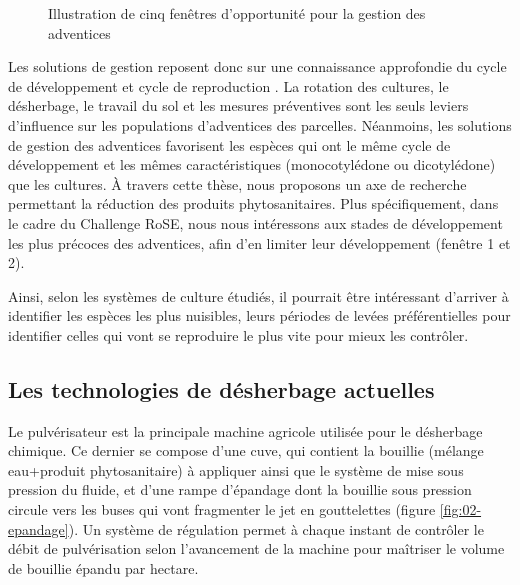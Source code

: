 \documentclass[../thesis.tex]{subfiles}
\begin{document}
    \vfill
    \begin{figure}[H]
        \centering
        
        \caption{Illustration de cinq fenêtres d'opportunité pour la gestion des adventices}
        \label{fig:02-weed-life-stages}
    \end{figure}
    \vfill
    
    Les solutions de gestion reposent donc sur une connaissance approfondie du cycle de développement et cycle de reproduction \cite{chauvel2018gestion}. La rotation des cultures, le désherbage, le travail du sol et les mesures préventives sont les seuls leviers d'influence sur les populations d'adventices des parcelles. Néanmoins, les solutions de gestion des adventices favorisent les espèces qui ont le même cycle de développement et les mêmes caractéristiques (monocotylédone ou dicotylédone) que les cultures. À travers cette thèse, nous proposons un axe de recherche permettant la réduction des produits phytosanitaires. %
    Plus spécifiquement, dans le cadre du Challenge RoSE, nous nous intéressons aux stades de développement les plus précoces des adventices, afin d'en limiter leur développement (fenêtre 1 et 2).
    
    \par Ainsi, selon les systèmes de culture étudiés, il pourrait être intéressant d'arriver à identifier les espèces les plus nuisibles, leurs périodes de levées préférentielles pour identifier celles qui vont se reproduire le plus vite pour mieux les contrôler. %
    
    
    \newpage
    
    \subsection{Les technologies de désherbage actuelles}
    
    Le pulvérisateur est la principale machine agricole utilisée pour le désherbage chimique. Ce dernier se compose d'une cuve, qui contient la bouillie (mélange eau+produit phytosanitaire) à appliquer ainsi que le système de mise sous pression du fluide, et d'une rampe d'épandage dont la bouillie sous pression circule vers les buses qui vont fragmenter le jet en gouttelettes (figure \ref{fig:02-epandage}).  Un système de régulation permet à chaque instant de contrôler le débit de pulvérisation selon l'avancement de la machine pour maîtriser le volume de bouillie épandu par hectare.
    
\end{document}
